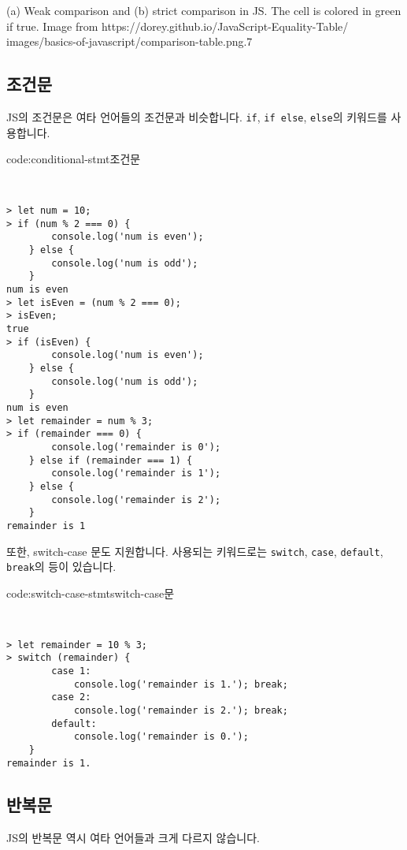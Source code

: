     {(a) Weak comparison and (b) strict comparison in JS. The cell is colored in green if true. Image from https://dorey.github.io/JavaScript-Equality-Table/}
    {images/basics-of-javascript/comparison-table.png}{.7}

\subsection*{조건문}

JS의 조건문은 여타 언어들의 조건문과 비슷합니다. \texttt{if}, \texttt{if else}, \texttt{else}의 키워드를 사용합니다. 

\begin{codeenv}{code:conditional-stmt}{조건문}\begin{verbatim}


> let num = 10;
> if (num % 2 === 0) {
        console.log('num is even');
    } else {
        console.log('num is odd');
    }
num is even
> let isEven = (num % 2 === 0);
> isEven;
true
> if (isEven) {
        console.log('num is even');
    } else {
        console.log('num is odd');
    }
num is even
> let remainder = num % 3;
> if (remainder === 0) {
        console.log('remainder is 0');
    } else if (remainder === 1) {
        console.log('remainder is 1');
    } else {
        console.log('remainder is 2');
    }
remainder is 1
\end{verbatim}
\end{codeenv}

또한, switch-case 문도 지원합니다. 사용되는 키워드로는 \texttt{switch}, \texttt{case}, \texttt{default}, \texttt{break}의 등이 있습니다. 

\begin{codeenv}{code:switch-case-stmt}{switch-case문}\begin{verbatim}


> let remainder = 10 % 3;
> switch (remainder) {
        case 1:
            console.log('remainder is 1.'); break;
        case 2:
            console.log('remainder is 2.'); break;
        default:
            console.log('remainder is 0.');
    }
remainder is 1.
\end{verbatim}
\end{codeenv}

\subsection*{반복문}

JS의 반복문 역시 여타 언어들과 크게 다르지 않습니다. 

